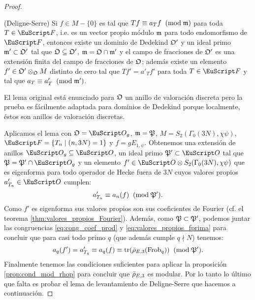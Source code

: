 \documentclass[../../tesis_maestria]{subfiles}
\begin{document}
\begin{proof}
\begin{lema}\label{lema:deligne_serre}%
(Deligne-Serre) Si $f\in M-\{0\}$ es tal que $Tf\equiv a_Tf\;\;(\mathrm{mod}\; \mathfrak{m})$ para toda $T\in\Ff$, i.e. es un vector propio m\'odulo $\mathfrak{m}$ para todo endomorfismo de $\Ff$, entonces existe un dominio de Dedekind $\mathfrak{O}'$ y un ideal primo $\mathfrak{m}'\subset\mathfrak{O}'$ tal que $\mathfrak{O}\subseteq\mathfrak{O}'$, $\mathfrak{m}=\mathfrak{O}\cap\mathfrak{m}'$ y el campo de fracciones de $\mathfrak{O}'$ es una extensi\'on finita del campo de fracciones de $\mathfrak{O}$; adem\'as existe un elemento $f'\in\mathfrak{O}'\otimes_{\mathfrak{O}}M$ distinto de cero tal que $Tf'=a'_{T}f'$ para toda $T\in\Ff$ y tal que $a_T\equiv a'_T\;\;(\mathrm{mod}\; \mathfrak{m}')$.
\end{lema}%

\begin{nota}
  El lema original est\'a enunciado para $\mathfrak{O}$ un anillo de valoraci\'on discreta pero la prueba es f\'acilmente adaptada para dominios de Dedekind porque localmente, éstos son anillos de valoración discretas.  
\end{nota}

Aplicamos el lema con $\fO=\Oo_g$, $\mathfrak{m}=\mathfrak{P}$, $M=S_2(\Gamma_0(3N),\chi\psi)$, $\Ff=\{T_n\mid (n,3N)=1\}$ y $f=gE_{1,\psi}$. Obtenemos una extensi\'on de  anillos $\Oo_g\subseteq\Oo$, un ideal primo $\fP'\subset\Oo$ tal que $\fP=\fP'\cap\Oo_g$ y un elemento $f'\in \Oo\otimes S_2(\Gamma_0(3N),\chi\psi)$ que es eigenforma para todo operador de Hecke fuera de $3N$ cuyos valores propios $a'_{T_n}\in\Oo$ cumplen:
\begin{equation}\label{eq:valores_propios_fprima}
  a'_{T_n}\equiv a_n(f) \;\;(\mathrm{mod}\; \mathfrak{P}').
\end{equation}
Como $f'$ es eigenforma sus valores propios son sus coeficientes de Fourier (cf. el teorema \ref{thm:valores_propios_Fourier}). Adem\'as, como $\mathfrak{P}\subset\mathfrak{P}'$, podemos juntar las congruencias \eqref{eq:cong_coef_prod} y \eqref{eq:valores_propios_fprima} para concluir que para casi todo primo $q$ (que adem\'as cumple $q\nmid N$) tenemos:
\[
  a_q(f')=a'_{T_q}\equiv a_q(f)\equiv\mathrm{tr}(\bar{\rho}_{E,3}(\mathrm{Frob}_q))\;\;(\mathrm{mod}\; \mathfrak{P}').
\]
Finalmente tenemos las condiciones suficientes para aplicar la proposici\'on \ref{prop:cond_mod_rhop} para concluir que $\bar{\rho}_{E,3}$ es modular. Por lo tanto lo \'ultimo que falta es probar el lema de levantamiento de Deligne-Serre que hacemos a continuaci\'on.
\end{proof}
\end{document}
